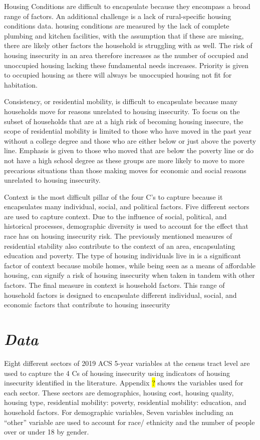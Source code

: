 Housing Conditions are difficult to encapsulate because they encompass a broad range of factors. An additional challenge is a lack of rural-specific housing conditions data. housing conditions are measured by the lack of complete plumbing and kitchen facilities, with the assumption that if these are missing, there are likely other factors the household is struggling with as well. The risk of housing insecurity in an area therefore increases as the number of occupied and unoccupied housing lacking these fundamental needs increases. Priority is given to occupied housing as there will always be unoccupied housing not fit for habitation. 

Consistency, or residential mobility, is difficult to encapsulate because many households move for reasons unrelated to housing insecurity. To focus on the subset of households that are at a high risk of becoming housing insecure, the scope of residential mobility is limited to those who have moved in the past year without a college degree and those who are either below or just above the poverty line. Emphasis is given to those who moved that are below the poverty line or do not have a high school degree as these groups are more likely to move to more precarious situations than those making moves for economic and social reasons unrelated to housing insecurity. 

Context is the most difficult pillar of the four C's to capture because it encapsulates many individual, social, and political factors. Five different sectors are used to capture context. Due to the influence of social, political, and historical processes, demographic diversity is used to account for the effect that race has on housing insecurity risk. The previously mentioned measures of residential stability also contribute to the context of an area, encapsulating education and poverty. The type of housing individuals live in is a significant factor of context because mobile homes, while being seen as a means of affordable housing, can signify a risk of housing insecurity when taken in tandem with other factors. The final measure in context is household factors. This range of household factors is designed to encapsulate different individual, social, and economic factors that contribute to housing insecurity 

\section{\textit{Data}}

Eight different sectors of 2019 ACS 5-year variables at the census tract level are used to capture the 4 Cs of housing insecurity using indicators of housing insecurity identified in the literature. Appendix \hl{?} shows the variables used for each sector. These sectors are demographics, housing cost, housing quality, housing type, residential mobility: poverty, residential mobility: education, and household factors. For demographic variables, Seven variables including an “other” variable are used to account for race/ ethnicity and the number of people over or under 18 by gender. 


